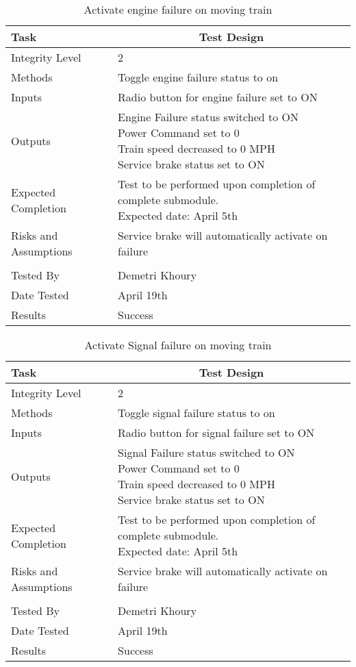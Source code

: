 \documentclass[]{article}
\begin{document}
	\begin{table}[H]
		\centering
		\caption{Activate engine failure on moving train}
		\begin{tabular}{|l|l|}
			\hline
			Task & \multicolumn{1}{c|}{Test Design} \\ \hline
			Integrity Level & 2 \\ \hline
			Methods & Toggle engine failure status to on  \\ \hline
			Inputs &  Radio button for engine failure set to ON \\ \hline
			Outputs & \parbox[t]{10cm}{ Engine Failure status switched to ON\\ Power Command set to 0\\ Train speed decreased to 0 MPH\\ Service brake status set to ON  }\\ \hline
			Expected Completion & \parbox[t]{10cm}{Test to be performed upon completion of complete submodule.\\ Expected date: April 5th}\\ \hline
			Risks and Assumptions & Service brake will automatically activate on failure\\ \hline
			\\ \hline
			Tested By   &  Demetri Khoury\\	\hline
			Date Tested & \parbox[t]{10cm}{April 19th}\\ \hline
			Results & Success\\ \hline
		\end{tabular}
	\end{table}

	\begin{table}[H]
		\centering
		\caption{Activate Signal failure on moving train}
		\begin{tabular}{|l|l|}
			\hline
			Task & \multicolumn{1}{c|}{Test Design} \\ \hline
			Integrity Level & 2 \\ \hline
			Methods & Toggle signal failure status to on  \\ \hline
			Inputs &  Radio button for signal failure set to ON \\ \hline
			Outputs & \parbox[t]{10cm}{ Signal Failure status switched to ON\\ Power Command set to 0\\ Train speed decreased to 0 MPH\\ Service brake status set to ON  }\\ \hline
			Expected Completion & \parbox[t]{10cm}{Test to be performed upon completion of complete submodule.\\ Expected date: April 5th}\\ \hline
			Risks and Assumptions & Service brake will automatically activate on failure\\ \hline
			\\ \hline
			Tested By   &  Demetri Khoury\\	\hline
			Date Tested & \parbox[t]{10cm}{April 19th}\\ \hline
			Results & Success\\ \hline
		\end{tabular}
	\end{table}
\end{document}
